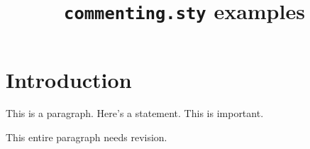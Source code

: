 \documentclass{article}
\title{\texttt{commenting.sty} examples}
\date{}
\begin{document}
\maketitle

\section{Introduction}

This is a  paragraph.
Here's a statement.
This is  important.

\begin{bobenv}
This entire paragraph needs revision.
\end{bobenv}
\end{document}
